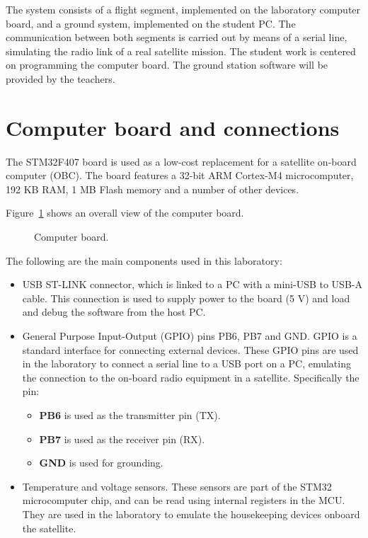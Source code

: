 The system consists of a flight segment, implemented on the laboratory computer board, and a ground system, implemented on the student PC. The communication between both segments is carried out by means of a serial line, simulating the radio link of a real satellite mission.
The student work is centered on programming the computer board. The ground station software will be provided by the teachers.

\section*{Computer board and connections}

The STM32F407 board is used as a low-cost replacement for a satellite on-board computer (OBC). The board features a 32-bit ARM Cortex-M4 microcomputer, 192 KB RAM, 1 MB Flash memory and a number of other devices.

Figure~\ref{fig:board} shows an overall view of the computer board.

\begin{figure}[hbtp!]
            \caption{Computer board.}
            \label{fig:board}
\end{figure}

The following are the main components used in this laboratory:
\begin{itemize}
	\item	USB ST-LINK connector, which is linked to a PC with a mini-USB to USB-A cable. This connection is used to supply power to the board (5 V) and load and debug the software from the host PC.
	
	\item	General Purpose Input-Output (GPIO) pins PB6, PB7 and GND.
	GPIO is a standard interface for connecting external devices.
	These GPIO pins are used in the laboratory
	to connect a serial line to a USB port on a PC,
	emulating the connection to the on-board radio equipment in a satellite.
	Specifically the pin:
	\begin{itemize}
		\item \textbf{PB6} is used as the transmitter pin (TX).
		\item \textbf{PB7} is used as the receiver pin (RX).
		\item \textbf{GND} is used for grounding.
	\end{itemize}
	
	\item	Temperature and voltage sensors. These sensors are part of the STM32 microcomputer chip,
	and can be read using internal registers in the MCU.
	They are used in the laboratory to emulate the housekeeping devices onboard the satellite.
\end{itemize}
